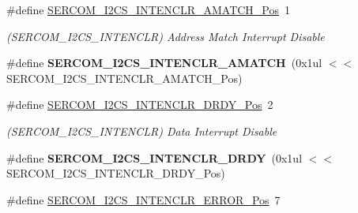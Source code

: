 \begin{DoxyCompactItemize}
\item 
\hypertarget{group___s_a_m_l21___s_e_r_c_o_m_ga353ffd16a0647dace21435cd1800d1e3}{}\#define \hyperlink{group___s_a_m_l21___s_e_r_c_o_m_ga353ffd16a0647dace21435cd1800d1e3}{S\+E\+R\+C\+O\+M\+\_\+\+I2\+C\+S\+\_\+\+I\+N\+T\+E\+N\+C\+L\+R\+\_\+\+A\+M\+A\+T\+C\+H\+\_\+\+Pos}~1\label{group___s_a_m_l21___s_e_r_c_o_m_ga353ffd16a0647dace21435cd1800d1e3}

\begin{DoxyCompactList}\small\item\em (S\+E\+R\+C\+O\+M\+\_\+\+I2\+C\+S\+\_\+\+I\+N\+T\+E\+N\+C\+L\+R) Address Match Interrupt Disable \end{DoxyCompactList}\item 
\hypertarget{group___s_a_m_l21___s_e_r_c_o_m_ga1009ef23a3d5063c70c229815491cf7a}{}\#define {\bfseries S\+E\+R\+C\+O\+M\+\_\+\+I2\+C\+S\+\_\+\+I\+N\+T\+E\+N\+C\+L\+R\+\_\+\+A\+M\+A\+T\+C\+H}~(0x1ul $<$$<$ S\+E\+R\+C\+O\+M\+\_\+\+I2\+C\+S\+\_\+\+I\+N\+T\+E\+N\+C\+L\+R\+\_\+\+A\+M\+A\+T\+C\+H\+\_\+\+Pos)\label{group___s_a_m_l21___s_e_r_c_o_m_ga1009ef23a3d5063c70c229815491cf7a}

\item 
\hypertarget{group___s_a_m_l21___s_e_r_c_o_m_ga61850c98bec47e0def379c0a4133e8c7}{}\#define \hyperlink{group___s_a_m_l21___s_e_r_c_o_m_ga61850c98bec47e0def379c0a4133e8c7}{S\+E\+R\+C\+O\+M\+\_\+\+I2\+C\+S\+\_\+\+I\+N\+T\+E\+N\+C\+L\+R\+\_\+\+D\+R\+D\+Y\+\_\+\+Pos}~2\label{group___s_a_m_l21___s_e_r_c_o_m_ga61850c98bec47e0def379c0a4133e8c7}

\begin{DoxyCompactList}\small\item\em (S\+E\+R\+C\+O\+M\+\_\+\+I2\+C\+S\+\_\+\+I\+N\+T\+E\+N\+C\+L\+R) Data Interrupt Disable \end{DoxyCompactList}\item 
\hypertarget{group___s_a_m_l21___s_e_r_c_o_m_ga7f079209991a221dbe48b0a46e525e43}{}\#define {\bfseries S\+E\+R\+C\+O\+M\+\_\+\+I2\+C\+S\+\_\+\+I\+N\+T\+E\+N\+C\+L\+R\+\_\+\+D\+R\+D\+Y}~(0x1ul $<$$<$ S\+E\+R\+C\+O\+M\+\_\+\+I2\+C\+S\+\_\+\+I\+N\+T\+E\+N\+C\+L\+R\+\_\+\+D\+R\+D\+Y\+\_\+\+Pos)\label{group___s_a_m_l21___s_e_r_c_o_m_ga7f079209991a221dbe48b0a46e525e43}

\item 
\hypertarget{group___s_a_m_l21___s_e_r_c_o_m_ga7be3db9610effc27caa280fe57a021da}{}\#define \hyperlink{group___s_a_m_l21___s_e_r_c_o_m_ga7be3db9610effc27caa280fe57a021da}{S\+E\+R\+C\+O\+M\+\_\+\+I2\+C\+S\+\_\+\+I\+N\+T\+E\+N\+C\+L\+R\+\_\+\+E\+R\+R\+O\+R\+\_\+\+Pos}~7\label{group___s_a_m_l21___s_e_r_c_o_m_ga7be3db9610effc27caa280fe57a021da}


\end{DoxyCompactItemize}
